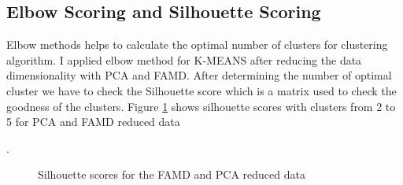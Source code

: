 \documentclass[12pt]{article}
\begin{document}
\subsection{Elbow Scoring and Silhouette Scoring}
Elbow methods helps to calculate the optimal number of clusters for clustering algorithm. I applied elbow method for K-MEANS after reducing the data dimensionality with PCA and FAMD. After determining the number of optimal cluster we have to check the Silhouette score which is a matrix used to check the goodness of the clusters. Figure \ref {fig:scores} shows silhouette scores with clusters from 2 to 5 for PCA and FAMD reduced data

.
\begin{figure}[h!]
	\centering
	\qquad
	\caption{Silhouette scores for the FAMD and PCA reduced data}%
	\label{fig:scores}%
\end{figure}
\end{document}
